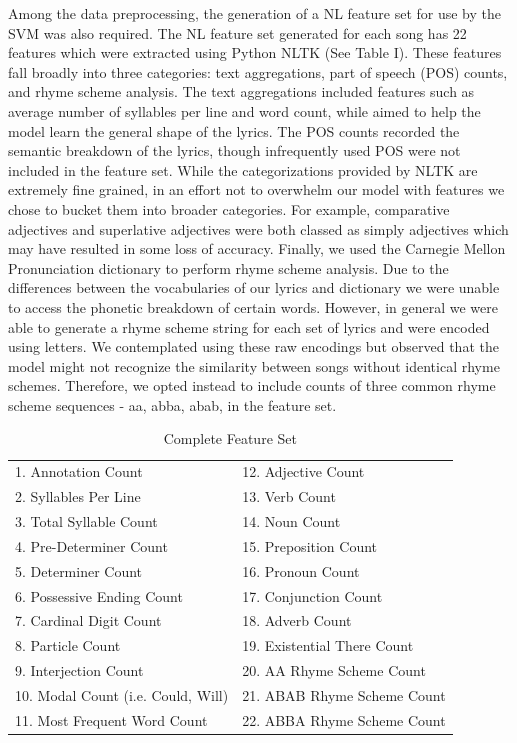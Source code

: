 \documentclass[journal]{IEEEtran}
\begin{document}
Among the data preprocessing, the generation of a NL feature set for use by the SVM was also required. The NL feature set generated for each song has 22 features which were extracted using Python NLTK (See Table I). These features fall broadly into three categories: text aggregations, part of speech (POS) counts, and rhyme scheme analysis. The text aggregations included features such as average number of syllables per line and word count, while aimed to help the model learn the general shape of the lyrics. The POS counts recorded the semantic breakdown of the lyrics, though infrequently used POS were not included in the feature set. While the categorizations provided by NLTK are extremely fine grained, in an effort not to overwhelm our model with features we chose to bucket them into broader categories. For example, comparative adjectives and superlative adjectives were both classed as simply adjectives which may have resulted in some loss of accuracy. Finally, we used the Carnegie Mellon Pronunciation dictionary to perform rhyme scheme analysis. Due to the differences between the vocabularies of our lyrics and dictionary we were unable to access the phonetic breakdown of certain words. However, in general we were able to generate a rhyme scheme string for each set of lyrics and were encoded using letters. We contemplated using these raw encodings but observed that the model might not recognize the similarity between songs without identical rhyme schemes. Therefore, we opted instead to include counts of three common rhyme scheme sequences - aa, abba, abab, in the feature set.

\begin{table}[h!]
    \label{tab:table1}
    \centering
    \caption{Complete Feature Set}
    \begin{tabular}{ll}
       & \\
      \hline
      
	1. Annotation Count & 12. Adjective Count \\
	2. Syllables Per Line & 13. Verb Count \\
	3. Total Syllable Count & 14. Noun Count \\
	4. Pre-Determiner Count& 15. Preposition Count \\
	5. Determiner Count & 16. Pronoun Count \\
	6. Possessive Ending Count & 17. Conjunction Count\\
	7. Cardinal Digit Count & 18. Adverb Count\\
	8. Particle Count & 19. Existential There Count \\
	9. Interjection Count & 20. AA Rhyme Scheme Count \\
	10. Modal Count (i.e. Could, Will)  & 21. ABAB Rhyme Scheme Count \\
	11. Most Frequent Word Count & 22. ABBA Rhyme Scheme Count
	
    \end{tabular}
\end{table}
\end{document}
